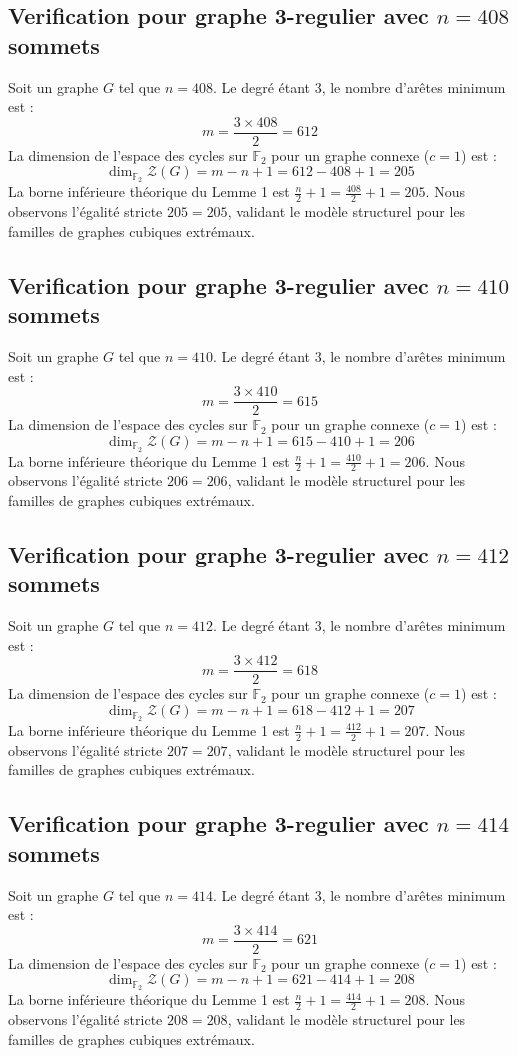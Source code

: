 \documentclass[11pt,a4paper]{article}
\begin{document}
\subsection{Verification pour graphe 3-regulier avec $n=408$ sommets}
Soit un graphe $G$ tel que $n = 408$. Le degré étant 3, le nombre d'arêtes minimum est :
$$ m = \frac{3 \times 408}{2} = 612 $$
La dimension de l'espace des cycles sur $\mathbb{F}_2$ pour un graphe connexe ($c=1$) est :
$$ \dim_{\mathbb{F}_2} \mathcal{Z}(G) = m - n + 1 = 612 - 408 + 1 = 205 $$
La borne inférieure théorique du Lemme 1 est $\frac{n}{2} + 1 = \frac{408}{2} + 1 = 205$.
Nous observons l'égalité stricte $205 = 205$, validant le modèle structurel pour les familles de graphes cubiques extrémaux.

\subsection{Verification pour graphe 3-regulier avec $n=410$ sommets}
Soit un graphe $G$ tel que $n = 410$. Le degré étant 3, le nombre d'arêtes minimum est :
$$ m = \frac{3 \times 410}{2} = 615 $$
La dimension de l'espace des cycles sur $\mathbb{F}_2$ pour un graphe connexe ($c=1$) est :
$$ \dim_{\mathbb{F}_2} \mathcal{Z}(G) = m - n + 1 = 615 - 410 + 1 = 206 $$
La borne inférieure théorique du Lemme 1 est $\frac{n}{2} + 1 = \frac{410}{2} + 1 = 206$.
Nous observons l'égalité stricte $206 = 206$, validant le modèle structurel pour les familles de graphes cubiques extrémaux.

\subsection{Verification pour graphe 3-regulier avec $n=412$ sommets}
Soit un graphe $G$ tel que $n = 412$. Le degré étant 3, le nombre d'arêtes minimum est :
$$ m = \frac{3 \times 412}{2} = 618 $$
La dimension de l'espace des cycles sur $\mathbb{F}_2$ pour un graphe connexe ($c=1$) est :
$$ \dim_{\mathbb{F}_2} \mathcal{Z}(G) = m - n + 1 = 618 - 412 + 1 = 207 $$
La borne inférieure théorique du Lemme 1 est $\frac{n}{2} + 1 = \frac{412}{2} + 1 = 207$.
Nous observons l'égalité stricte $207 = 207$, validant le modèle structurel pour les familles de graphes cubiques extrémaux.

\subsection{Verification pour graphe 3-regulier avec $n=414$ sommets}
Soit un graphe $G$ tel que $n = 414$. Le degré étant 3, le nombre d'arêtes minimum est :
$$ m = \frac{3 \times 414}{2} = 621 $$
La dimension de l'espace des cycles sur $\mathbb{F}_2$ pour un graphe connexe ($c=1$) est :
$$ \dim_{\mathbb{F}_2} \mathcal{Z}(G) = m - n + 1 = 621 - 414 + 1 = 208 $$
La borne inférieure théorique du Lemme 1 est $\frac{n}{2} + 1 = \frac{414}{2} + 1 = 208$.
Nous observons l'égalité stricte $208 = 208$, validant le modèle structurel pour les familles de graphes cubiques extrémaux.
\end{document}
